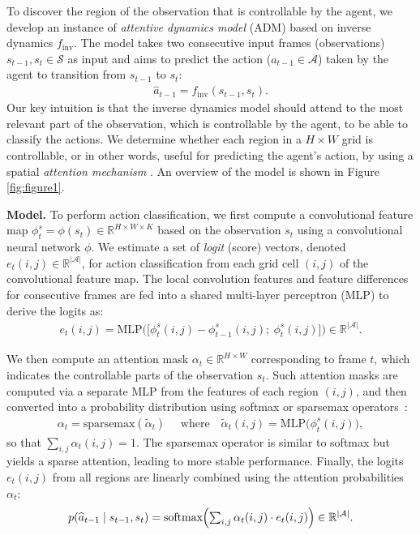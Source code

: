 \documentclass{article} \usepackage{iclr,times}
\newcommand{\softmax}{\operatornamewithlimits{softmax}}
\newcommand{\R}{\mathbb R}
\begin{document}
To discover the region of the observation
that is controllable by the agent,
we develop an instance of \emph{attentive dynamics model} (ADM) based on inverse dynamics $f_\text{inv}$.
The model
takes two consecutive input frames (observations) $s_{t-1}, s_{t} \in \mathcal{S}$ as input
and aims to predict the action ($a_{t-1} \in \mathcal A$) taken by the agent
to transition from $s_{t-1}$ to $s_{t}$:
\begin{align}
\widehat{a}_{t-1} = f_\text{inv}(s_{t-1}, s_{t}).
\end{align}
Our key intuition is that the inverse dynamics model should
attend to the most relevant part of the observation,
which is controllable by the agent,
to be able to classify the actions.
We determine
whether each region in a $H \times W$ grid is controllable, or in other words,
useful for predicting the agent's action,
by using a spatial \emph{attention mechanism}
\citep{Bahdanau:ICLR2015:Attention,Xu:ICML2015:ShowAttendTell}.
An overview of the model is shown in Figure \ref{fig:figure1}.


\textbf{Model.}
To perform action classification, we first compute a convolutional feature map $\phi_t^s = \phi(s_t) \in \R^{H \times W \times K}$
based on the observation $s_t$ using a convolutional neural network $\phi$.
We estimate a set of {\em logit} (score) vectors, denoted $e_t (i, j) \in \mathbb{R}^{|\mathcal A|}$,
for action classification from each grid cell $(i, j)$ of the convolutional feature map.
The local convolution features and feature differences for consecutive frames are fed into a 
shared multi-layer perceptron (MLP) to derive the logits as:
\vspace*{-2pt}\begin{align}
    e_t(i, j) =
        \mathrm{MLP}\Big(\big[
\phi^s_{t}(i, j) - \phi^s_{t-1}(i, j)  ;~  \phi^s_{t}(i, j)
\big]\Big)
    \in \mathbb{R}^{|\mathcal A|}.
\end{align}
\vspace*{-10pt}

We then compute an attention mask $\alpha_t \in \mathbb R^{H \times W}$ corresponding to frame $t$, which
indicates the controllable parts of the observation $s_t$.
Such attention masks are computed via a separate MLP from the features of each region $(i, j)$,
and then converted into a probability distribution using softmax or sparsemax operators~\citep{Martins:2016:Sparsemax}:
\begin{align}
\alpha_t = \mathrm{sparsemax}(\widetilde{\alpha}_t)
    \text{~~~~where~~~}
    \widetilde{\alpha}_t(i, j) = \mathrm{MLP}\big( \phi^s_t (i,j) \big),
\end{align}
so that $\sum_{i,j} \alpha_t(i,j)=1$.
The sparsemax operator is similar to softmax but yields a sparse attention, leading to more stable performance.
Finally, the logits $e_t(i, j)$ from all regions
are linearly combined using the attention probabilities $\alpha_t$:
\begin{align}
    p(\widehat a_{t-1} \mid s_{t-1}, s_{t}) = \softmax \hspace*{-2pt}\left( {
            \textstyle \sum_{i,j} \alpha_{t}(i,j) \cdot e_t(i, j)
    } \right)\in \mathbb R^{|\mathcal A|}.
\end{align}
\end{document}
